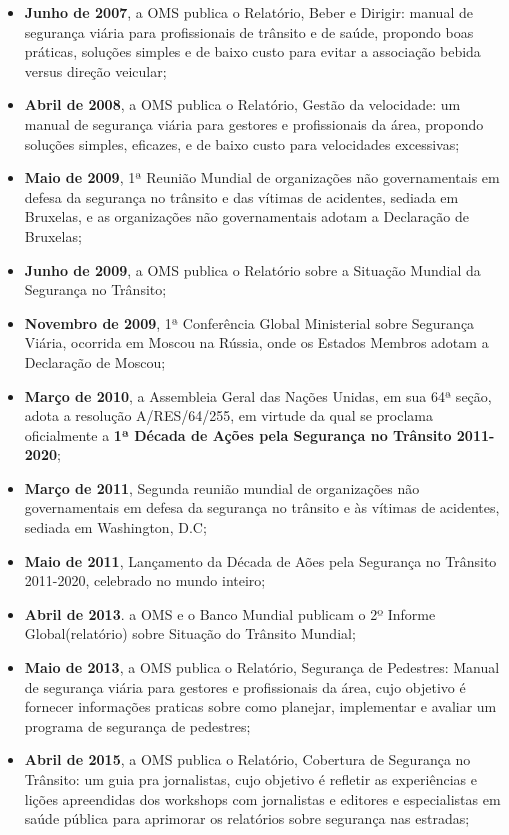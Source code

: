 \documentclass[output=paper,colorlinks,citecolor=green]{langscibook}
\begin{document}
\begin{itemize}
\item \textbf{Junho de 2007}, a OMS publica o Relatório, Beber e Dirigir: manual de segurança viária para profissionais de trânsito e de saúde, propondo boas práticas, soluções simples e de baixo custo para evitar a associação bebida versus direção veicular;
\item \textbf{Abril de 2008}, a OMS publica o Relatório, Gestão da velocidade: um manual de segurança viária para gestores e profissionais da área, propondo soluções simples, eficazes, e de baixo custo para velocidades excessivas;
\item \textbf{Maio de 2009}, 1ª Reunião Mundial de organizações não governamentais em defesa da segurança no trânsito e das vítimas de acidentes, sediada em Bruxelas, e as organizações não governamentais adotam a Declaração de Bruxelas;
\item \textbf{Junho de 2009}, a OMS publica o Relatório sobre a Situação Mundial da Segurança no Trânsito;
\item \textbf{Novembro de 2009}, 1ª Conferência Global Ministerial sobre Segurança Viária, ocorrida em Moscou na Rússia, onde os Estados Membros adotam a Declaração de Moscou;
\item \textbf{Março de 2010}, a Assembleia Geral das Nações Unidas, em sua 64ª seção, adota a resolução A/RES/64/255, em virtude da qual se proclama oﬁcialmente a \textbf{1ª Década de Ações pela Segurança no Trânsito 2011-2020};
\item \textbf{Março de 2011}, Segunda reunião mundial de organizações não governamentais em defesa da segurança no trânsito e às vítimas de acidentes, sediada em Washington, D.C;
\item \textbf{Maio de 2011}, Lançamento da Década de Aões pela Segurança no Trânsito 2011-2020, celebrado no mundo inteiro;
\item \textbf{Abril de 2013}. a OMS e o Banco Mundial publicam o 2º Informe Global(relatório) sobre Situação do Trânsito Mundial;
\item \textbf{Maio de 2013}, a OMS publica o Relatório, Segurança de Pedestres: Manual de segurança viária para gestores e profissionais da área, cujo objetivo é fornecer informações praticas sobre como planejar, implementar e avaliar um programa de segurança de pedestres;
\item \textbf{Abril de 2015}, a OMS publica o Relatório, Cobertura de Segurança no Trânsito: um guia pra jornalistas, cujo objetivo é refletir as experiências e lições apreendidas dos workshops com jornalistas e editores e especialistas em saúde pública para aprimorar os relatórios sobre segurança nas estradas;

\end{itemize}
\end{document}
